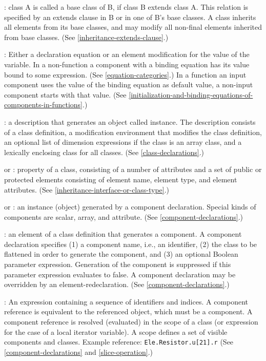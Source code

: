: class A is called a base class of B, if class B
extends class A. This relation is specified by an extends clause in B or
in one of B's base classes. A class inherits all elements from its base
classes, and may modify all non-final elements inherited from base
classes. (See \autoref{inheritance-extends-clause}.)

: Either a declaration equation or an element
modification for the value of the variable. In a non-function a component with a binding
equation has its value bound to some expression. (See \autoref{equation-categories}.)
In a function an input component uses the value of the binding equation as default value,
a non-input component starts with that value.
(See \autoref{initialization-and-binding-equations-of-components-in-functions}.)

: a description that generates an object called instance.
The description consists of a class definition, a modification
environment that modifies the class definition, an optional list of
dimension expressions if the class is an array class, and a lexically
enclosing class for all classes. (See \autoref{class-declarations}.)

 or : property of a
class, consisting of a number of attributes and a set of public or
protected elements consisting of element name, element type, and element
attributes. (See \autoref{inheritance-interface-or-class-type}.)

 or : an instance (object) generated
by a component declaration. Special kinds of components are scalar,
array, and attribute. (See \autoref{component-declarations}.)

: an element of a class definition that
generates a component. A component declaration specifies (1) a component
name, i.e., an identifier, (2) the class to be flattened in order to
generate the component, and (3) an optional Boolean parameter
expression. Generation of the component is suppressed if this parameter
expression evaluates to false. A component declaration may be overridden
by an element-redeclaration. (See \autoref{component-declarations}.)

: An expression containing a sequence of
identifiers and indices. A component reference is equivalent to the
referenced object, which must be a component. A component reference is
resolved (evaluated) in the scope of a class (or expression for the case
of a local iterator variable). A scope defines a set of visible
  components and classes. Example reference: \lstinline!Ele.Resistor.u[21].r! (See
\autoref{component-declarations} and \autoref{slice-operation}.)

